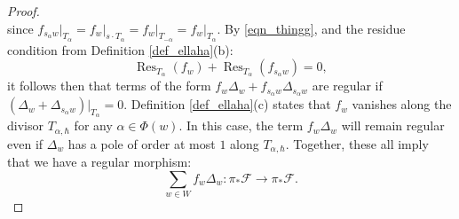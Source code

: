 \documentclass[a4paper]{report}
\theoremstyle{theorem}
\theoremstyle{definition}
\theoremstyle{remark}
\theoremstyle{proposition}
\theoremstyle{conjecture}
\theoremstyle{lemma}
\theoremstyle{corollary}
\theoremstyle{exercise}
\theoremstyle{example}
\newcommand{\mcal}{\mathcal}
\newcommand{\on}{\operatorname}
\begin{document}
\begin{proof}
\begin{equation}
      \end{equation}
      since $f_{s_\alpha w}\vert_{T_\alpha} = f_w \vert_{s\cdot T_\alpha} = f_w\vert_{T_{-\alpha}} = f_w\vert_{T_\alpha}$.
      By \eqref{eqn_thingg}, and the residue condition from Definition \ref{def_ellaha}(b): 
      $$\on{Res}_{T_\alpha}(f_w) + \on{Res}_{T_\alpha}(f_{s_\alpha w}) = 0,$$
      it follows then that terms of the form $f_w\Delta_w + f_{s_\alpha w}\Delta_{s_\alpha w}$ are regular if $(\Delta_w + \Delta_{s_\alpha w})\vert_{T_\alpha} = 0$.
      Definition \ref{def_ellaha}(c) states that $f_w$ vanishes along the divisor $T_{\alpha,\hbar}$ for any $\alpha \in \Phi(w)$. 
      In this case, the term $f_w\Delta_w$ will remain regular even if $\Delta_w$ has a pole of order at most $1$ along $T_{\alpha,\hbar}$. Together, these all imply that 
      we have a regular morphism: $$\sum_{w\in W} f_w\Delta_w : \pi_\ast \mcal{F} \longrightarrow \pi_\ast\mcal{F}.$$ 
  \end{proof}
  
\end{document}
